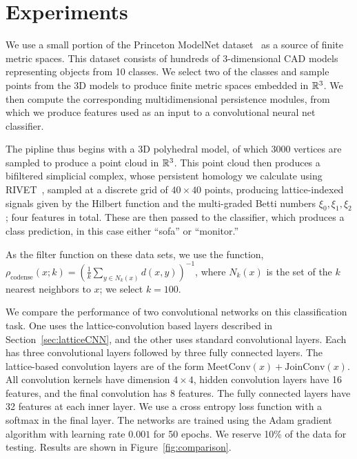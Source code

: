 \documentclass{article}
\begin{document}
\section{Experiments}
We use a small portion of the Princeton ModelNet
dataset~\cite{zhirong_wu_3d_2015} as a source of finite
metric spaces. This dataset consists of hundreds of 3-dimensional CAD models
representing objects from 10 classes. We select two of the classes and sample
points from the 3D models to produce finite metric spaces embedded in $\mathbb{R}^3$.
We then compute the corresponding multidimensional persistence modules, from
which we produce features used as an input to a convolutional neural net
classifier.

The pipline thus begins with a 3D polyhedral model, of which $3000$ vertices are sampled to produce a point
cloud in $\mathbb{R}^3$. This point cloud then produces a bifiltered simplicial complex,
whose persistent homology we calculate using
RIVET~\cite{lesnick_interactive_2015}, sampled at a discrete grid of $40 \times
40$ points, producing lattice-indexed signals given by the Hilbert function and
the multi-graded Betti numbers $\xi_0, \xi_1, \xi_2$; four features in total. These are then passed to the classifier, which
produces a class prediction, in this case either ``sofa'' or ``monitor.''

As the filter function on these data sets, we use the  function, $\rho_{\text{codense}}(x;k) = \left( \frac{1}{k} \sum_{y \in N_k(x)} d(x,y) \right)^{-1}$,
where $N_k(x)$ is the set of the $k$ nearest neighbors to $x$; we select $k=100$.



We compare the performance of two convolutional networks on this classification
task. One uses the lattice-convolution based layers described in
Section~\ref{sec:latticeCNN}, and the other uses standard convolutional layers.
Each has three convolutional layers followed by three fully connected layers.
The lattice-based convolution layers are of the form $\text{MeetConv}(x) +
\text{JoinConv}(x)$. All convolution kernels have dimension $4 \times 4$, hidden
convolution layers have 16 features, and the final convolution has 8 features.
The fully connected layers have 32 features at each inner layer.
We use a cross entropy loss function with a softmax in the final layer.
The networks are trained using the Adam gradient algorithm with learning rate
$0.001$ for 50 epochs. We reserve 10\% of the data for testing. Results are
shown in Figure~\ref{fig:comparison}.
\end{document}
